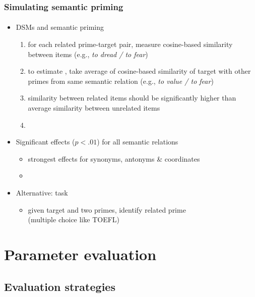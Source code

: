 \documentclass[t]{beamer} %
\begin{document}
\begin{frame}
  \frametitle{Simulating semantic priming}
  \framesubtitle{\citet{McDonald:Brew:04,Pado:Lapata:07}}
 \begin{itemize}
 \item DSMs and semantic priming
  \begin{enumerate}
  \item for each related prime-target pair, 
  measure cosine-based similarity between items (e.g.,
    \emph{to dread / to fear})
    \pause
  \item to estimate , take average of cosine-based similarity of target with other primes from same semantic relation (e.g., \emph{to value / to fear})
    \pause
  \item similarity between related items should be significantly higher
    than average similarity between unrelated items
    \item[]
  \end{enumerate}
\item<4-> Significant effects ($p < .01$) for all semantic relations 
  \begin{itemize}
  \item strongest effects for synonyms, antonyms \& coordinates
  \item[]
  \end{itemize}
\item<5-> Alternative:  task
  \begin{itemize}
  \item given target and two primes, identify related prime\\ (\so multiple choice like TOEFL)
  \end{itemize}
  \end{itemize}
\end{frame}


\section{Parameter evaluation}

\subsection{Evaluation strategies}
\end{document}
